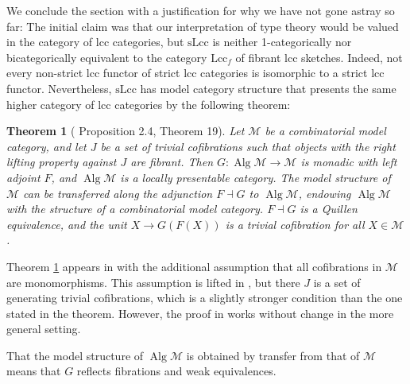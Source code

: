 \documentclass[a4paper]{article}
\newtheorem{theorem}{Theorem}
\theoremstyle{remark}
\theoremstyle{definition}
\begin{document}
We conclude the section with a justification for why we have not gone astray so far:
The initial claim was that our interpretation of type theory would be valued in the category of lcc categories, but $\mathrm{sLcc}$ is neither 1-categorically nor bicategorically equivalent to the category $\mathrm{Lcc}_f$ of fibrant lcc sketches.
Indeed, not every non-strict lcc functor of strict lcc categories is isomorphic to a strict lcc functor.
Nevertheless, $\mathrm{sLcc}$ has model category structure that presents the same higher category of lcc categories by the following theorem:
\begin{theorem}[\citet{algebraic-models} Proposition 2.4, \citet{equipping-weak-equivalences} Theorem 19]
  \label{th:algebraically-fibrant-model-category}
  Let $\mathcal{M}$ be a combinatorial model category, and let $J$ be a set of trivial cofibrations such that objects with the right lifting property against $J$ are fibrant.
  Then $G : \operatorname{Alg} \mathcal{M} \rightarrow \mathcal{M}$ is monadic with left adjoint $F$, and $\operatorname{Alg} \mathcal{M}$ is a locally presentable category.
  The model structure of $\mathcal{M}$ can be transferred along the adjunction $F \dashv G$ to $\operatorname{Alg} \mathcal{M}$, endowing $\operatorname{Alg} \mathcal{M}$ with the structure of a combinatorial model category.
  $F \dashv G$ is a Quillen equivalence, and the unit $X \rightarrow G(F(X))$ is a trivial cofibration for all $X \in \mathcal{M}$.
\end{theorem}
Theorem \ref{th:algebraically-fibrant-model-category} appears in \citet{algebraic-models} with the additional assumption that all cofibrations in $\mathcal{M}$ are monomorphisms.
This assumption is lifted in \citet{equipping-weak-equivalences}, but there $J$ is a set of generating trivial cofibrations, which is a slightly stronger condition than the one stated in the theorem.
However, the proof in \citet{equipping-weak-equivalences} works without change in the more general setting.

That the model structure of $\operatorname{Alg} \mathcal{M}$ is obtained by transfer from that of $\mathcal{M}$ means that $G$ reflects fibrations and weak equivalences.
\end{document}
